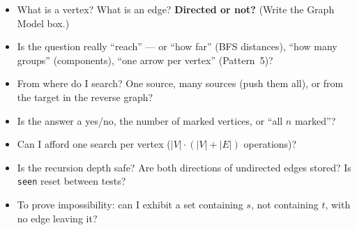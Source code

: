 \begin{checklistbox}
\begin{itemize}[leftmargin=*]
    \item[$\square$] What is a vertex? What is an edge? \textbf{Directed or not?} (Write the Graph Model box.)
    \item[$\square$] Is the question really ``reach'' --- or ``how far'' (BFS distances), ``how many groups'' (components), ``one arrow per vertex'' (Pattern~5)?
    \item[$\square$] From where do I search? One source, many sources (push them all), or from the target in the reverse graph?
    \item[$\square$] Is the answer a yes/no, the number of marked vertices, or ``all $n$ marked''?
    \item[$\square$] Can I afford one search per vertex ($|V| \cdot (|V|+|E|)$ operations)?
    \item[$\square$] Is the recursion depth safe? Are both directions of undirected edges stored? Is \texttt{seen} reset between tests?
    \item[$\square$] To prove impossibility: can I exhibit a set containing $s$, not containing $t$, with no edge leaving it?
\end{itemize}
\end{checklistbox}
